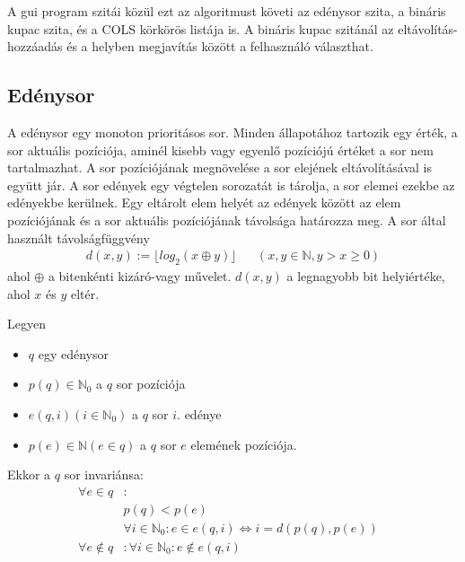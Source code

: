 A gui program szitái közül ezt az algoritmust követi az edénysor szita, a bináris kupac szita, és a COLS körkörös listája is. A bináris kupac szitánál az eltávolítás-hozzáadás és a helyben megjavítás között a felhasználó választhat.

\subsection{Edénysor}

A edénysor egy monoton prioritásos sor.
Minden állapotához tartozik egy érték, a sor aktuális pozíciója, aminél kisebb vagy egyenlő pozíciójú értéket a sor nem tartalmazhat.
A sor pozíciójának megnövelése a sor elejének eltávolításával is együtt jár.
A sor edények egy végtelen sorozatát is tárolja, a sor elemei ezekbe az edényekbe kerülnek.
Egy eltárolt elem helyét az edények között az elem pozíciójának és a sor aktuális pozíciójának távolsága határozza meg.
A sor által használt távolságfüggvény
\begin{align*}
d(x, y) := \lfloor log_{2}{}(x \oplus y) \rfloor & & (x, y \in \mathbb{N}, y > x \ge 0)
\end{align*}
ahol $\oplus$ a bitenkénti kizáró-vagy művelet. $d(x, y)$ a legnagyobb bit helyiértéke, ahol $x$ és $y$ eltér.

Legyen  %
\begin{itemize}
\item $q$ egy edénysor
\item $p(q) \in \mathbb{N}_0$ a $q$ sor pozíciója
\item $e(q, i) (i \in \mathbb{N}_0)$ a $q$ sor $i$. edénye
\item $p(e) \in \mathbb{N} (e \in q)$ a $q$ sor $e$ elemének pozíciója.  %

\end{itemize}
Ekkor a $q$ sor invariánsa:
\begin{align*}
\forall e \in q &: &\\ 
	& p(q) < p(e) \\
	& \forall i \in \mathbb{N}_0: e \in e(q, i) \iff i=d(p(q), p(e)) \\
\forall e \not\in q &: \forall i \in \mathbb{N}_0: e \not\in e(q, i)
\end{align*}

